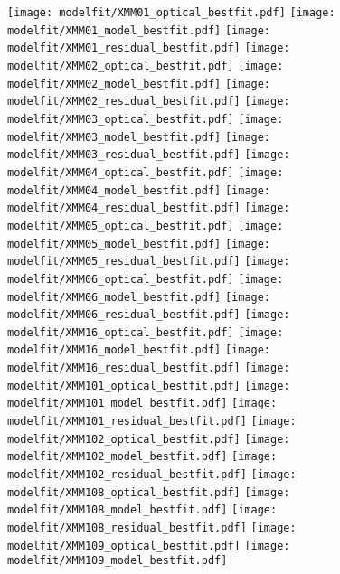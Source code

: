 \documentclass[iop]{emulateapj}
\begin{document}
\begin{figure*}[!tbp] 
    \begin{centering}
\texttt{[image: modelfit/XMM01\_optical\_bestfit.pdf]}
\texttt{[image: modelfit/XMM01\_model\_bestfit.pdf]}
\texttt{[image: modelfit/XMM01\_residual\_bestfit.pdf]}
\texttt{[image: modelfit/XMM02\_optical\_bestfit.pdf]}
\texttt{[image: modelfit/XMM02\_model\_bestfit.pdf]}
\texttt{[image: modelfit/XMM02\_residual\_bestfit.pdf]}
\texttt{[image: modelfit/XMM03\_optical\_bestfit.pdf]}
\texttt{[image: modelfit/XMM03\_model\_bestfit.pdf]}
\texttt{[image: modelfit/XMM03\_residual\_bestfit.pdf]}
\texttt{[image: modelfit/XMM04\_optical\_bestfit.pdf]}
\texttt{[image: modelfit/XMM04\_model\_bestfit.pdf]}
\texttt{[image: modelfit/XMM04\_residual\_bestfit.pdf]}
\texttt{[image: modelfit/XMM05\_optical\_bestfit.pdf]}
\texttt{[image: modelfit/XMM05\_model\_bestfit.pdf]}
\texttt{[image: modelfit/XMM05\_residual\_bestfit.pdf]}
\texttt{[image: modelfit/XMM06\_optical\_bestfit.pdf]}
\texttt{[image: modelfit/XMM06\_model\_bestfit.pdf]}
\texttt{[image: modelfit/XMM06\_residual\_bestfit.pdf]}
\texttt{[image: modelfit/XMM16\_optical\_bestfit.pdf]}
\texttt{[image: modelfit/XMM16\_model\_bestfit.pdf]}
\texttt{[image: modelfit/XMM16\_residual\_bestfit.pdf]}
\texttt{[image: modelfit/XMM101\_optical\_bestfit.pdf]}
\texttt{[image: modelfit/XMM101\_model\_bestfit.pdf]}
\texttt{[image: modelfit/XMM101\_residual\_bestfit.pdf]}
\texttt{[image: modelfit/XMM102\_optical\_bestfit.pdf]}
\texttt{[image: modelfit/XMM102\_model\_bestfit.pdf]}
\texttt{[image: modelfit/XMM102\_residual\_bestfit.pdf]}
\texttt{[image: modelfit/XMM108\_optical\_bestfit.pdf]}
\texttt{[image: modelfit/XMM108\_model\_bestfit.pdf]}
\texttt{[image: modelfit/XMM108\_residual\_bestfit.pdf]}
\texttt{[image: modelfit/XMM109\_optical\_bestfit.pdf]}
\texttt{[image: modelfit/XMM109\_model\_bestfit.pdf]}

\end{centering}
\end{figure*}
\end{document}
